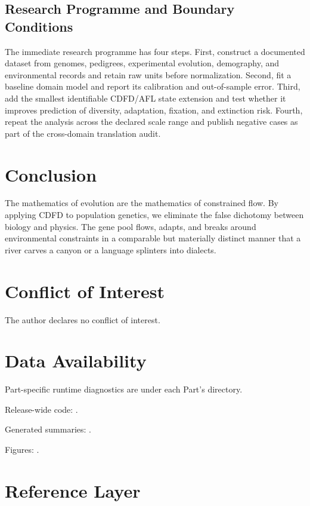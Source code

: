 \documentclass[11pt,a4paper]{article}
\begin{document}
\subsection{Research Programme and Boundary Conditions}

The immediate research programme has four steps. First, construct a documented
dataset from genomes, pedigrees, experimental evolution, demography, and environmental records and retain raw units before normalization.
Second, fit a baseline domain model and report its calibration and out-of-sample
error. Third, add the smallest identifiable CDFD/AFL state extension and test
whether it improves prediction of diversity, adaptation, fixation, and extinction risk. Fourth, repeat the
analysis across the declared scale range and publish negative cases as part of
the cross-domain translation audit.


\section{Conclusion}
The mathematics of evolution are the mathematics of constrained flow. By applying CDFD to population genetics, we eliminate the false dichotomy between biology and physics. The gene pool flows, adapts, and breaks around environmental constraints in a comparable but materially distinct manner that a river carves a canyon or a language splinters into dialects.
\section*{Conflict of Interest} The author declares no conflict of interest.
\section*{Data Availability}
Part-specific runtime diagnostics are under each Part's  directory.

Release-wide code: .

Generated summaries: .

Figures: .


\section{Reference Layer}


\end{document}
